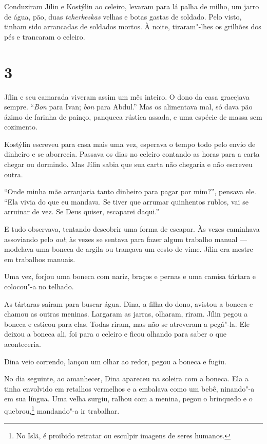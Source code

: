 Conduziram Jílin e Kostýlin ao celeiro, levaram para lá palha de milho,
um jarro de água, pão, duas \emph{tcherkeskas} velhas e botas gastas de
soldado. Pelo visto, tinham sido arrancadas de soldados mortos. À noite,
tiraram"-lhes os grilhões dos pés e trancaram o celeiro.

\section{3}

Jílin e seu camarada viveram assim um mês inteiro. O dono da casa
gracejava sempre. ``\emph{Bon} para Ivan; \emph{bon} para Abdul.'' Mas
os alimentava mal, só dava pão ázimo de farinha de painço, panqueca
rústica assada, e uma espécie de massa sem cozimento.

Kostýlin escreveu para casa mais uma vez, esperava o tempo todo pelo
envio de dinheiro e se aborrecia. Passava os dias no celeiro contando as
horas para a carta chegar ou dormindo. Mas Jílin sabia que sua carta não
chegaria e não escreveu outra.

``Onde minha mãe arranjaria tanto dinheiro para pagar por mim?'',
pensava ele. ``Ela vivia do que eu mandava. Se tiver que arrumar
quinhentos rublos, vai se arruinar de vez. Se Deus quiser, escaparei
daqui.''

E tudo observava, tentando descobrir uma forma de escapar. Às vezes
caminhava assoviando pelo \emph{aul}; às vezes se sentava para fazer
algum trabalho manual --- modelava uma boneca de argila ou trançava um
cesto de vime. Jílin era mestre em trabalhos manuais.

Uma vez, forjou uma boneca com nariz, braços e pernas e uma camisa
tártara e colocou"-a no telhado.

As tártaras saíram para buscar água. Dina, a filha do dono, avistou a
boneca e chamou as outras meninas. Largaram as jarras, olharam, riram.
Jílin pegou a boneca e esticou para elas. Todas riram, mas não se
atreveram a pegá"-la. Ele deixou a boneca ali, foi para o celeiro e ficou
olhando para saber o que aconteceria.

Dina veio correndo, lançou um olhar ao redor, pegou a boneca e fugiu.

No dia seguinte, ao amanhecer, Dina apareceu na soleira com a boneca.
Ela a tinha envolvido em retalhos vermelhos e a embalava como um bebê,
ninando"-a em sua língua. Uma velha surgiu, ralhou com a menina, pegou o
brinquedo e o quebrou,\footnote{No Islã, é proibido retratar ou
  esculpir imagens de seres humanos.} mandando"-a ir trabalhar.

